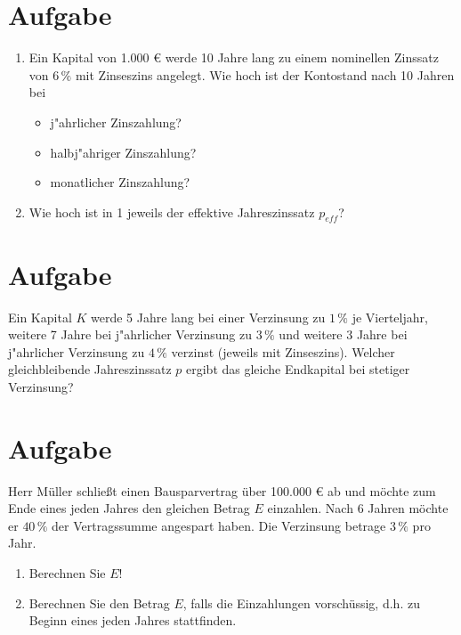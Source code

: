 \documentclass[fontsize=11pt, parskip=half]{scrartcl}
\begin{document}
    \section{Aufgabe}
    \begin{enumerate}
    \item Ein Kapital von 1.000 € werde 10 Jahre lang zu einem
    nominellen Zinssatz von $6 \,\%$ mit Zinseszins angelegt.
     Wie hoch ist der Kontostand nach 10 Jahren bei \vspace{-0.2cm}
    \begin{itemize}
    \item j"ahrlicher Zinszahlung? 
    \item halbj"ahriger Zinszahlung?
    \item monatlicher Zinszahlung?
    \end{itemize}\vspace{-0.2cm}
    \item Wie hoch ist in 1 jeweils der effektive Jahreszinssatz
    $p_{eff}$? 
    \end{enumerate}
    

    
    \section{Aufgabe}
     Ein Kapital $K$ werde 5 Jahre lang bei einer Verzinsung zu $1
    \,\%$ je Vierteljahr, weitere 7 Jahre bei j"ahrlicher Verzinsung zu
    $3 \,\%$ und weitere 3 Jahre bei j"ahrlicher Verzinsung zu $4 \,\%$
    verzinst (jeweils mit Zinseszins). Welcher gleichbleibende
    Jahreszinssatz $p$ ergibt das gleiche Endkapital bei stetiger
    Verzinsung?
    
  
    
    \section{Aufgabe} 
 
        Herr Müller schlie{\ss}t einen Bausparvertrag über 100.000 € ab und möchte
    zum Ende eines jeden Jahres den gleichen Betrag $E$ einzahlen. Nach
    6 Jahren möchte er $40\,\%$ der Vertragssumme angespart haben. Die
    Verzinsung betrage $3\,\%$ pro Jahr. 
    \begin{enumerate}
        \item Berechnen Sie $E$! 
    \item Berechnen Sie den Betrag $E$, falls die Einzahlungen vorschüssig,
    d.h. zu Beginn eines jeden Jahres stattfinden.
    \end{enumerate}
    
\end{document}
